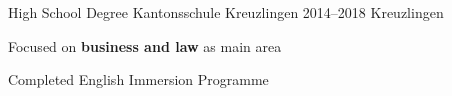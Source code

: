 \vspace{2mm}


\begin{cventries}

	\cventry
	{High School Degree} %
	{Kantonsschule Kreuzlingen} %
	{2014--2018} %
	{Kreuzlingen} %
	{
		\begin{cvitems} %
			\item {Focused on \textbf{business and law} as main area}
			\item {Completed English Immersion Programme}
		\end{cvitems}
	}
	{}


\end{cventries}
